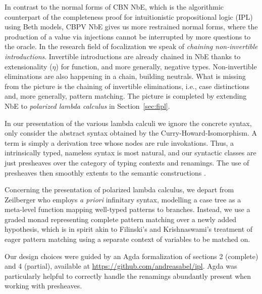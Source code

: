 \documentclass[a4paper,USenglish,cleveref, autoref]{lipics-v2019}
\begin{document}
In contrast to the normal forms of CBN NbE, which is the algorithmic
counterpart of the completeness proof for intuitionistic propositional
logic (IPL) using Beth models, CBPV NbE gives us more restrained
normal forms, where the production of a value via injections cannot be
interrupted by more questions to the oracle.  In the research field of
focalization \cite{andreoli:focusing,liangMiller:csl07} we speak of
\emph{chaining non-invertible introductions}.
Invertible introductions are already chained in NbE thanks to
extensionality ($\eta$) for function, and more generally, negative
types.  Non-invertible eliminations are also happening in a chain,
building neutrals.  What is missing from the picture is the chaining
of invertible eliminations, i.e., case distinctions and, more
generally, pattern matching.  The picture is completed by extending
NbE to \emph{polarized lambda calculus}
\cite{zeilberger:PhD,brockNannestadSchuermann:lpar10,espiritoSanto:entcs17}
in Section~\ref{sec:fipl}.


In our presentation of the various lambda calculi we ignore the
concrete syntax, only consider the abstract syntax obtained by the
Curry-Howard-Isomorphism.  A term is simply a derivation tree whose
nodes are rule invokations.  Thus, a intrinsically typed,
nameless syntax is most natural,
and our syntactic classes are just presheaves over the category of
typing contexts and renamings.  The use of presheaves then smoothly
extents to the semantic constructions
\cite{catarina:csl93,altenkirchHofmannStreicher:ctcs95}.

Concerning the presentation of polarized lambda calculus, we depart from
Zeilberger \cite{zeilberger:PhD} who employs \emph{a priori}
infinitary syntax, modelling a case tree as a meta-level function mapping
well-typed patterns to branches.  Instead, we use a graded monad
representing complete pattern matching over a newly added hypothesis,
which is in spirit akin to Filinski's \cite[Section~4]{filinski:tlca01}
and Krishnaswami's \cite{krishnaswami:popl09} treatment of eager
pattern matching using a separate context of variables to be matched
on.

Our design choices were guided by an Agda formalization of sections 2
(complete) and 4 (partial), available at \url{https://github.com/andreasabel/ipl}.
Agda was particularly helpful to correctly handle the renamings
abundantly present when working with presheaves.


\end{document}
